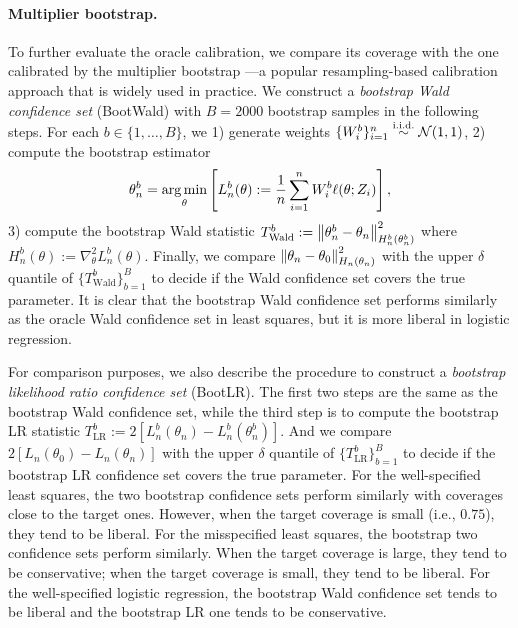 \paragraph{Multiplier bootstrap.}
To further evaluate the oracle calibration, we compare its coverage with the one calibrated by the multiplier bootstrap \citep[e.g.,][]{chen2020robust}---a popular resampling-based calibration approach that is widely used in practice.
We construct a \emph{bootstrap Wald confidence set} (BootWald) with $B = 2000$ bootstrap samples in the following steps.
For each $b \in \{1, \dots, B\}$, we 1) generate weights $\{W_i^b\}_{i=1}^n \overset{\mbox{\scriptsize i.i.d.}}{\sim} \mathcal{N}(1, 1)$, 2) compute the bootstrap estimator
\begin{align*}
  \theta_n^b = \operatorname*{arg\,min}_{\theta} \left[ L_n^b(\theta) := \frac1n \sum_{i=1}^n W_i^b \ell(\theta; Z_i) \right],
\end{align*}
3) compute the bootstrap Wald statistic $T_{\text{Wald}}^b := \left\lVert \theta_n^b - \theta_n \right\rVert_{H_n^b(\theta_n^b)}^2$ where $H_n^b(\theta) := \nabla_\theta^2 L_n^b(\theta)$.
Finally, we compare $\left\lVert \theta_n - \theta_0 \right\rVert_{H_n(\theta_n)}^2$ with the upper $\delta$ quantile of $\{T_{\text{Wald}}^b\}_{b=1}^B$ to decide if the Wald confidence set covers the true parameter.
It is clear that the bootstrap Wald confidence set performs similarly as the oracle Wald confidence set in least squares, but it is more liberal in logistic regression.

For comparison purposes, we also describe the procedure to construct a \emph{bootstrap likelihood ratio confidence set} (BootLR).
The first two steps are the same as the bootstrap Wald confidence set, while the third step is to compute the bootstrap LR statistic $T_{\text{LR}}^b := 2[L_n^b(\theta_n) - L_n^b(\theta_n^b)]$.
And we compare $2[L_n(\theta_0) - L_n(\theta_n)]$ with the upper $\delta$ quantile of $\{T_{\text{LR}}^b\}_{b=1}^B$ to decide if the bootstrap LR confidence set covers the true parameter.
For the well-specified least squares, the two bootstrap confidence sets perform similarly with coverages close to the target ones.
However, when the target coverage is small (i.e., $0.75$), they tend to be liberal.
For the misspecified least squares, the bootstrap two confidence sets perform similarly.
When the target coverage is large, they tend to be conservative; when the target coverage is small, they tend to be liberal.
For the well-specified logistic regression, the bootstrap Wald confidence set tends to be liberal and the bootstrap LR one tends to be conservative.
